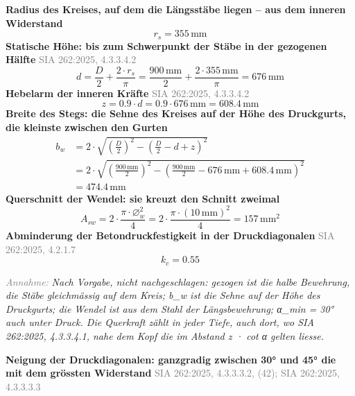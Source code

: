 \documentclass[11pt,a4paper]{article}
\newcommand{\normref}[1]{{\small\textcolor{gray}{#1}}}
\newcommand{\hinweis}[2]{\par\noindent\textcolor{gray}{\textit{#1:}} \textit{#2}\par}
\begin{document}
\noindent\textbf{Radius des Kreises, auf dem die Längsstäbe liegen -- aus dem inneren Widerstand}
\begin{equation*}
r_s = 355\,\mathrm{mm}
\end{equation*}
\noindent\textbf{Statische Höhe: bis zum Schwerpunkt der Stäbe in der gezogenen Hälfte} \hfill \normref{SIA 262:2025, 4.3.3.4.2}
\begin{equation*}
d = \frac{D}{2} + \frac{2 \cdot r_s}{\pi} = \frac{900\,\mathrm{mm}}{2} + \frac{2 \cdot 355\,\mathrm{mm}}{\pi} = 676\,\mathrm{mm}
\end{equation*}
\noindent\textbf{Hebelarm der inneren Kräfte} \hfill \normref{SIA 262:2025, 4.3.3.4.2}
\begin{equation*}
z = 0.9 \cdot d = 0.9 \cdot 676\,\mathrm{mm} = 608.4\,\mathrm{mm}
\end{equation*}
\noindent\textbf{Breite des Stegs: die Sehne des Kreises auf der Höhe des Druckgurts, die kleinste zwischen den Gurten}
\begin{equation*}
\begin{aligned}
  b_w &= 2 \cdot \sqrt{\left(\frac{D}{2}\right)^{2} - \left(\frac{D}{2} - d + z\right)^{2}} \\
  &= 2 \cdot \sqrt{\left(\frac{900\,\mathrm{mm}}{2}\right)^{2} - \left(\frac{900\,\mathrm{mm}}{2} - 676\,\mathrm{mm} + 608.4\,\mathrm{mm}\right)^{2}} \\
  &= 474.4\,\mathrm{mm}
\end{aligned}
\end{equation*}
\noindent\textbf{Querschnitt der Wendel: sie kreuzt den Schnitt zweimal}
\begin{equation*}
A_{sw} = 2 \cdot \frac{\pi \cdot \varnothing_w^{2}}{4} = 2 \cdot \frac{\pi \cdot \left(10\,\mathrm{mm}\right)^{2}}{4} = 157\,\mathrm{mm}^{2}
\end{equation*}
\noindent\textbf{Abminderung der Betondruckfestigkeit in der Druckdiagonalen} \hfill \normref{SIA 262:2025, 4.2.1.7}
\begin{equation*}
k_c = 0.55
\end{equation*}
\hinweis{Annahme}{Nach Vorgabe, nicht nachgeschlagen: gezogen ist die halbe Bewehrung, die Stäbe gleichmässig auf dem Kreis; b\_w ist die Sehne auf der Höhe des Druckgurts; die Wendel ist aus dem Stahl der Längsbewehrung; α\_min = 30° auch unter Druck. Die Querkraft zählt in jeder Tiefe, auch dort, wo SIA 262:2025, 4.3.3.4.1, nahe dem Kopf die im Abstand z · cot α gelten liesse.}
\noindent\textbf{Neigung der Druckdiagonalen: ganzgradig zwischen 30° und 45° die mit dem grössten Widerstand} \hfill \normref{SIA 262:2025, 4.3.3.3.2, (42); SIA 262:2025, 4.3.3.3.3}
\end{document}
